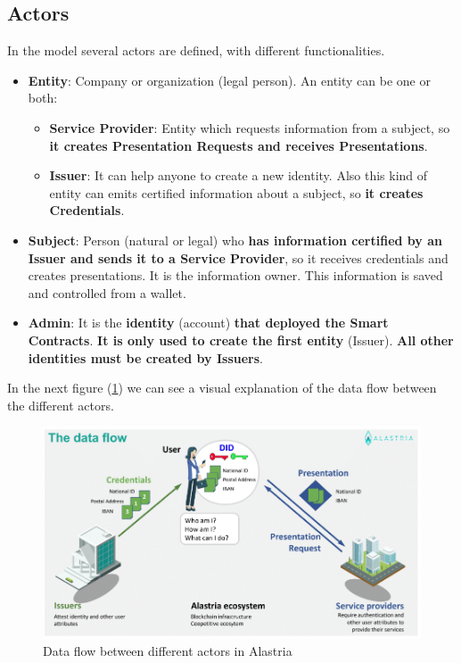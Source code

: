 \subsection{Actors}
In the model several actors are defined, with different functionalities.
\begin{itemize}
    \item \textbf{Entity}: Company or organization (legal person). An entity can be one or both:
          \begin{itemize}
              \item \textbf{Service Provider}: Entity which requests information from a subject, so \textbf{it creates Presentation Requests and receives Presentations}.
              \item \textbf{Issuer}: It can help anyone to create a new identity. Also this kind of entity can emits certified information about a subject, so \textbf{it creates Credentials}.
          \end{itemize}
    \item \textbf{Subject}: Person (natural or legal) who \textbf{has information certified by an Issuer and sends it to a Service Provider}, so it receives credentials and creates presentations. It is the information owner. This information is saved and controlled from a wallet.
    \item \textbf{Admin}: It is the \textbf{identity} (account) \textbf{that deployed the Smart Contracts}. \textbf{It is only used to create the first entity} (Issuer). \textbf{All other identities must be created by Issuers}.
\end{itemize}
In the next figure (\ref{fig:roles-ala}) we can see a visual explanation of the data flow between the different actors.
\begin{figure}[h]
    \centering
    \includegraphics[width=1.0\textwidth]{images/Alastria ID/roles-ala.png}
    \caption{Data flow between different actors in Alastria}
    \label{fig:roles-ala}
\end{figure}
